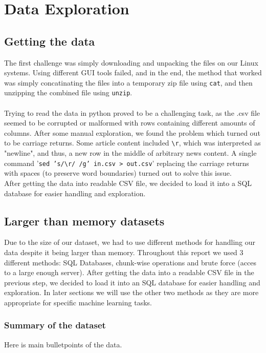 \section{Data Exploration}

\subsection{Getting the data}
The first challenge was simply downloading and unpacking the files on our Linux systems. Using different GUI tools failed, and in the end, the method that worked was simply concatinating the files into a temporary zip file using \texttt{cat}, and then unzipping the combined file using \texttt{unzip}.\\
\\
Trying to read the data in python proved to be a challenging task, as the .csv file seemed to be corrupted or malformed with rows containing different amounts of columns. After some manual exploration, we found the problem which turned out to be carriage returns. Some article content included \texttt{\textbackslash r}, which was interpreted as "newline", and thus, a new row in the middle of arbitrary news content. A single command '\texttt{sed 's/\textbackslash r/ /g' in.csv > out.csv}' replacing the carriage returns with spaces (to preserve word boundaries) turned out to solve this issue.\\

After getting the data into readable CSV file, we decided to load it into a SQL database for easier handling and
exploration.

\subsection{Larger than memory datasets}
Due to the size of our dataset, we had to use different methods for handling our data despite it being larger than
memory. Throughout this report we used 3 different methods: SQL Databases, chunk-wise operations and brute force (acces
to a large enough server). After getting the data into a readable CSV file in the previous step, we decided to load it
into an SQL database for easier handling and exploration. In later sections we will use the other two methods as they
are more appropriate for specific machine learning tasks.


\subsubsection{Summary of the dataset}
Here is main bulletpoints of the data.


